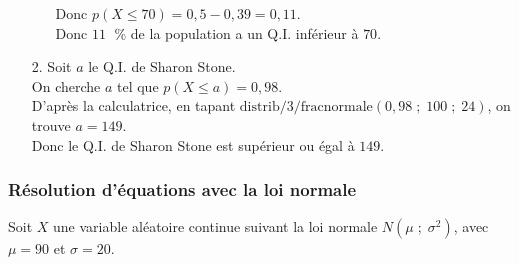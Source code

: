 \begin{itemize}
\begin{itemize}
Donc $p\left(X \leqslant 70\right) = 0,5 - 0,39 = 0,11$. \\

Donc $11 \;$ \% de la population a un Q.I. inférieur à $70$. \\ 
\end{itemize}
\item[2.] Soit $a$ le Q.I. de Sharon Stone. \\

On cherche $a$ tel que $p\left(X \leqslant a\right) = 0,98$. \\

D'après la calculatrice, en tapant $\mathrm{distrib}/3/\mathrm{fracnormale}\left(0,98 \; ; \; 100 \; ; \; 24\right)$, on trouve $a = 149$. \\

Donc le Q.I. de Sharon Stone est supérieur ou égal à $149$.

\vspace*{-50cm}

\end{itemize}

\vspace*{-50cm}

\newpage

\subsubsection{Résolution d'équations avec la loi normale}

Soit $X$ une variable aléatoire continue suivant la loi normale $N\left(\mu \; ; \; \sigma^2\right)$, avec $\mu = 90$ et $\sigma = 20$. \\

